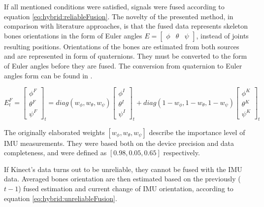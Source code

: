 \documentclass[sensors,article,submit,moreauthors,pdftex,10pt,a4paper]{mdpi}
\begin{document}
	If all mentioned conditions were satisfied, signals were fused according to equation \ref{eq:hybrid:reliableFusion}. The novelty of the presented method, in comparison with literature approaches, is that the fused data represents skeleton bones orientations in the form of Euler angles $E = \begin{bmatrix} \phi &  \theta & \psi \end{bmatrix}$, instead of joints resulting positions. Orientations of the bones are estimated from both sources and are represented in form of quaternions. They must be converted to the form of Euler angles before they are fused. The conversion from quaternion to Euler angles form can be found in \cite{Dunn2011}.
		
	\begin{equation} E^F_t = 
		\begin{bmatrix}  \phi^F \\  \theta^F \\  \psi^F \end{bmatrix}_t = 
		diag(w_\phi,w_\theta,w_\psi)
		\begin{bmatrix}  \phi^I \\  \theta^I \\  \psi^I \end{bmatrix}_t + 
		diag(1-w_\phi,1-w_\theta,1-w_\psi)
		\begin{bmatrix}  \phi^K \\  \theta^K \\  \psi^K \end{bmatrix}_t
		\label{eq:hybrid:reliableFusion}
	\end{equation}
		
	The originally elaborated weights $[w_\phi , w_\theta , w_\psi]$ describe the importance level of IMU measurements. They were based both on the device precision and data completeness, and were defined as $[0.98, 0.05, 0.65]$ respectively. 
		
	If Kinect’s data turns out to be unreliable, they cannot be fused with the IMU data. Averaged bones orientation are then estimated based on the previously ($t-1$) fused estimation and current change of IMU orientation, according to equation \ref{eq:hybrid:unreliableFusion}.
		
\end{document}

